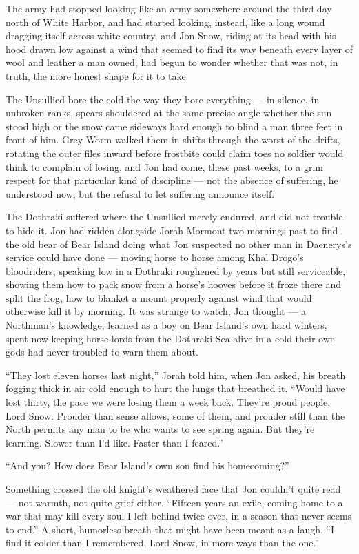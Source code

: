 The army had stopped looking like an army somewhere around the third day north of White Harbor, and had started looking, instead, like a long wound dragging itself across white country, and Jon Snow, riding at its head with his hood drawn low against a wind that seemed to find its way beneath every layer of wool and leather a man owned, had begun to wonder whether that was not, in truth, the more honest shape for it to take.

The Unsullied bore the cold the way they bore everything — in silence, in unbroken ranks, spears shouldered at the same precise angle whether the sun stood high or the snow came sideways hard enough to blind a man three feet in front of him. Grey Worm walked them in shifts through the worst of the drifts, rotating the outer files inward before frostbite could claim toes no soldier would think to complain of losing, and Jon had come, these past weeks, to a grim respect for that particular kind of discipline — not the absence of suffering, he understood now, but the refusal to let suffering announce itself.

The Dothraki suffered where the Unsullied merely endured, and did not trouble to hide it. Jon had ridden alongside Jorah Mormont two mornings past to find the old bear of Bear Island doing what Jon suspected no other man in Daenerys’s service could have done — moving horse to horse among Khal Drogo’s bloodriders, speaking low in a Dothraki roughened by years but still serviceable, showing them how to pack snow from a horse’s hooves before it froze there and split the frog, how to blanket a mount properly against wind that would otherwise kill it by morning. It was strange to watch, Jon thought — a Northman’s knowledge, learned as a boy on Bear Island’s own hard winters, spent now keeping horse-lords from the Dothraki Sea alive in a cold their own gods had never troubled to warn them about.

“They lost eleven horses last night,” Jorah told him, when Jon asked, his breath fogging thick in air cold enough to hurt the lungs that breathed it. “Would have lost thirty, the pace we were losing them a week back. They’re proud people, Lord Snow. Prouder than sense allows, some of them, and prouder still than the North permits any man to be who wants to see spring again. But they’re learning. Slower than I’d like. Faster than I feared.”

“And you? How does Bear Island’s own son find his homecoming?”

Something crossed the old knight’s weathered face that Jon couldn’t quite read — not warmth, not quite grief either. “Fifteen years an exile, coming home to a war that may kill every soul I left behind twice over, in a season that never seems to end.” A short, humorless breath that might have been meant as a laugh. “I find it colder than I remembered, Lord Snow, in more ways than the one.”

